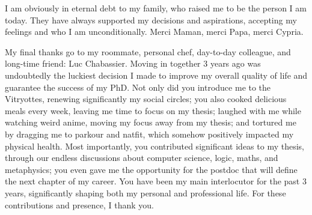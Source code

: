I am obviously in eternal debt to my family, who raised me to be the person I am today. They have always supported my decisions and aspirations, accepting my feelings and who I am unconditionally. Merci Maman, merci Papa, merci Cypria.

My final thanks go to my roommate, personal chef, day-to-day colleague, and long-time friend: Luc Chabassier. Moving in together 3 years ago was undoubtedly the luckiest decision I made to improve my overall quality of life and guarantee the success of my PhD. Not only did you introduce me to the Vitryottes, renewing significantly my social circles; you also cooked delicious meals every week, leaving me time to focus on my thesis; laughed with me while watching weird anime, moving my focus away from my thesis; and tortured me by dragging me to parkour and natfit, which somehow positively impacted my physical health. Most importantly, you contributed significant ideas to my thesis, through our endless discussions about computer science, logic, maths, and metaphysics; you even gave me the opportunity for the postdoc that will define the next chapter of my career. You have been my main interlocutor for the past 3 years, significantly shaping both my personal and professional life. For these contributions and presence, I thank you.